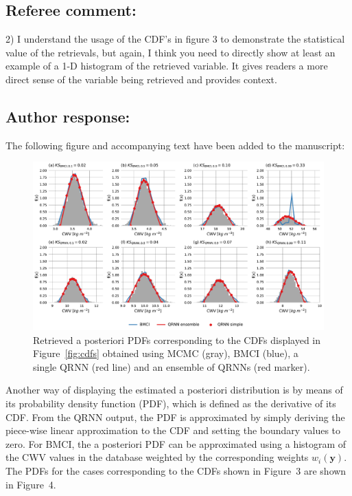 \documentclass[journal abbreviation, manuscript]{copernicus}
\begin{document}
\subsection*{Referee comment:}

2) I understand the usage of the CDF’s in figure 3 to demonstrate the statistical value of
the retrievals, but again, I think you need to directly show at least an example of a 1-D
histogram of the retrieved variable. It gives readers a more direct sense of the variable
being retrieved and provides context.

\subsection*{Author response:}

The following figure and accompanying text have been added to the manuscript:

  \begin{figure}[h!]
    \centering
    \includegraphics[width = 1.0\linewidth]{../plots/fig04}
    \caption{Retrieved a posteriori PDFs corresponding to the CDFs displayed
      in Figure~\ref{fig:cdfs} obtained using MCMC (gray), BMCI (blue), a single
      QRNN (red line) and an ensemble of QRNNs (red marker).}
    \label{fig:pdfs}
  \end{figure}

  \clearpage

\begin{em}
  Another way of displaying the estimated a posteriori distribution is by means
  of its probability density function (PDF), which is defined as the derivative
  of its CDF. From the QRNN output, the PDF is approximated by simply deriving
  the piece-wise linear approximation to the CDF and setting the boundary values
  to zero. For BMCI, the a posteriori PDF can be approximated using a histogram
  of the CWV values in the database weighted by the corresponding weights
  $w_i(\mathbf{y})$. The PDFs for the cases corresponding to the CDFs shown in
  Figure~3 are shown in Figure~4.
\end{em}
\end{document}
